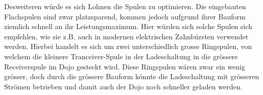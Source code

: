 Desweiteren würde es sich Lohnen die Spulen zu optimieren. Die eingebauten Flachspulen sind zwar platzsparend, kommen jedoch aufgrund ihrer Bauform ziemlich schnell an ihr Leistungsmaximum. Hier würden sich solche Spulen sich empfehlen, wie sie z.B. auch in modernen elektrischen Zahnbürsten verwendet werden. Hierbei handelt es sich um zwei unterschiedlich grosse Ringspulen, von welchem die kleinere Tranceiver-Spule in der Ladeschaltung in die grössere Receiverspule  im Dojo gesteckt wird. Diese Ringspulen wären zwar ein wenig grösser, doch durch die grössere Bauform könnte die Ladeschaltung mit grösseren Strömen betrieben und damit auch der Dojo noch schneller geladen werden.